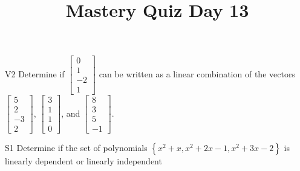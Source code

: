 \documentclass{sbgLAquiz}
\title{Mastery Quiz Day 13 }
\begin{document}
\begin{problem}{V2}
Determine if $\begin{bmatrix} 0 \\ 1 \\ -2 \\ 1 \end{bmatrix}$ can be written as a linear combination of the vectors $\begin{bmatrix} 5 \\ 2 \\ -3 \\ 2 \end{bmatrix}$, $\begin{bmatrix} 3 \\ 1 \\ 1 \\ 0 \end{bmatrix}$, and $\begin{bmatrix} 8 \\ 3 \\ 5 \\ -1 \end{bmatrix}$.
\end{problem}

\begin{problem}{S1}
Determine if the set of polynomials  $\left\{x^2+x, x^2+2x-1, x^2+3x-2\right\}$ is  linearly dependent or linearly independent
\end{problem}
\end{document}
